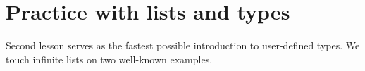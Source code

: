 \section{Practice with lists and types}

Second lesson serves as the fastest possible introduction to user-defined
types. We touch infinite lists on two well-known examples.


